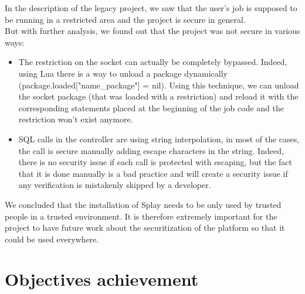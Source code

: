 \documentclass{eplmastersthesis}
\begin{document}
        In the description of the legacy project, we saw that the user's job is
        supposed to be running in a restricted area and the project is secure in
        general.\\
        But with further analysis, we found out that the project was not secure
        in various ways:\\
        \begin{itemize}
          \item The restriction on the socket can actually be completely
          bypassed. Indeed, using Lua there is a way to unload a package
          dynamically (package.loaded["name\_package"] = nil). Using this
          technique, we can unload the socket package (that was loaded with a
          restriction) and reload it with the corresponding statements placed
          at the beginning of the job code and the restriction won't exist
          anymore.
          \item SQL calls in the controller are using string interpolation,
          in most of the cases, the call is secure manually adding escape
          characters in the string. Indeed, there is no security issue if
          each call is protected with escaping, but the fact that it is done
          manually is a bad practice and will create a security issue if
          any verification is mistakenly skipped by a developer.
        \end{itemize}

        We concluded that the installation of Splay needs to be only
        used by trusted people in a trusted environment. It is therefore
        extremely important for the project to have future work about the
        securitization of the platform so that it could be used everywhere.

    \section{Objectives achievement} %

  \nocite{*}
  
  

  \backcoverpage
\end{document}
